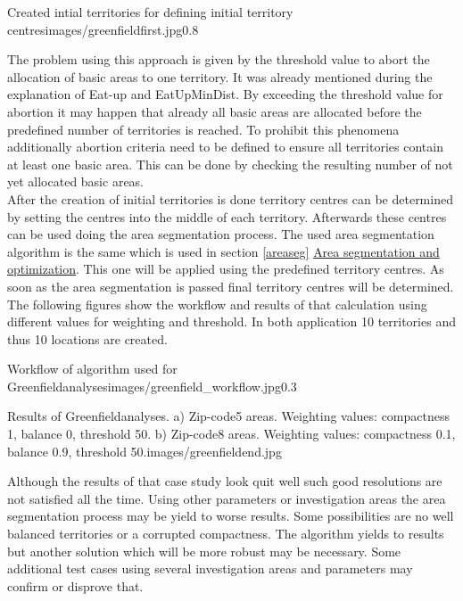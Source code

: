 \begin{figurevarSize}{Created intial territories for defining initial territory centres}{images/greenfieldfirst.jpg}{0.8}\end{figurevarSize}


The problem using this approach is given by the threshold value to abort the allocation of basic areas to one territory. It was already mentioned during the explanation of Eat-up and EatUpMinDist. By exceeding the threshold value for abortion it may happen that already all basic areas are allocated before the predefined number of territories is reached. To prohibit this phenomena additionally abortion criteria need to be defined to ensure all territories contain at least one basic area. This can be done by checking the resulting number of not yet allocated basic areas. \\
After the creation of initial territories is done territory centres can be determined by setting the centres into the middle of each territory. Afterwards these centres can be used doing the area segmentation process. The used area segmentation algorithm is the same which is used in section \ref{areaseg} \hyperref[areaseg]{Area segmentation and optimization}. This one will be applied using the predefined territory centres. As soon as the area segmentation is passed final territory centres will be determined. The following figures show the workflow and results of that calculation using different values for weighting and threshold. In both application 10 territories and thus 10 locations are created.

\begin{figurevarSize}{Workflow of algorithm used for Greenfieldanalyses}{images/greenfield_workflow.jpg}{0.3}\end{figurevarSize}

\begin{figureOwn}{Results of Greenfieldanalyses. a) Zip-code5 areas. Weighting values: compactness 1, balance 0, threshold 50. b) Zip-code8 areas. Weighting values: compactness 0.1, balance 0.9, threshold 50.}{images/greenfieldend.jpg}\end{figureOwn}

Although the results of that case study look quit well such good resolutions are not satisfied all the time. Using other parameters or investigation areas the area segmentation process may be yield to worse results. Some possibilities are no well balanced territories or a corrupted compactness. The algorithm yields to results but another solution which will be more robust may be necessary. Some additional test cases using several investigation areas and parameters may confirm or disprove that.

